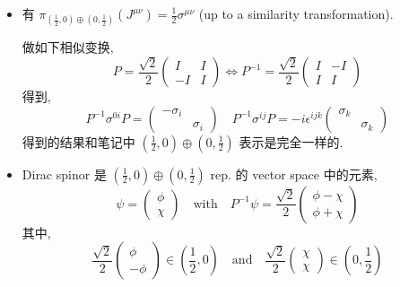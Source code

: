 \begin{itemize}
	\noindent\rule[0.5ex]{\linewidth}{0.5pt} %
	
	\item 有 $\pi_{(\frac{1}{2}, 0) \oplus (0, \frac{1}{2})}(J^{\mu \nu}) = \frac{1}{2} \sigma^{\mu \nu}$ (up to a similarity transformation).
	
	\begin{tcolorbox}[title=calculation:]
		做如下相似变换,
		\begin{equation}
			P = \frac{\sqrt{2}}{2} \begin{pmatrix}
				I & I \\
				- I & I
			\end{pmatrix} \iff P^{- 1} = \frac{\sqrt{2}}{2} \begin{pmatrix}
				I & - I \\
				I & I
			\end{pmatrix}
		\end{equation}
		得到,
		\begin{equation}
			P^{- 1} \sigma^{0 i} P = \begin{pmatrix}
				- \sigma_i & \\
				& \sigma_i
			\end{pmatrix} \quad P^{- 1} \sigma^{i j} P = - i \epsilon^{i j k} \begin{pmatrix}
				\sigma_k & \\
				& \sigma_k
			\end{pmatrix}
		\end{equation}
		得到的结果和笔记中 $(\frac{1}{2}, 0) \oplus (0, \frac{1}{2})$ 表示是完全一样的.
	\end{tcolorbox}
	
	\item Dirac spinor 是 $(\frac{1}{2}, 0) \oplus (0, \frac{1}{2})$ rep. 的 vector space 中的元素,
	\begin{equation}
		\psi = \begin{pmatrix}
			\phi \\
			\chi
		\end{pmatrix} \quad \text{with} \quad P^{- 1} \psi = \frac{\sqrt{2}}{2} \begin{pmatrix}
			\phi - \chi \\
			\phi + \chi
		\end{pmatrix}
	\end{equation}
	其中,
	\begin{equation}
		\frac{\sqrt{2}}{2} \begin{pmatrix}
			\phi \\
			- \phi
		\end{pmatrix} \in (\frac{1}{2}, 0) \quad \text{and} \quad \frac{\sqrt{2}}{2} \begin{pmatrix}
			\chi \\
			\chi
		\end{pmatrix} \in (0, \frac{1}{2})
	\end{equation}
	

\end{itemize}
